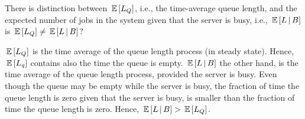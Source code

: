\begin{question}
  There is distinction between $\,\mathbb{E}\left[L_Q\right]$, i.e., the time-average queue
  length, and the expected number of jobs in the system given that the
  server is busy, i.e., $\,\mathbb{E}\left[L\,\middle|\, B\right]$ is $\,\mathbb{E}\left[L_Q\right] \neq \,\mathbb{E}\left[L\,\middle|\, B\right]$?
\begin{solution}
  $\,\mathbb{E}\left[L_Q\right]$ is the time average of the queue length process (in steady
  state). Hence, $\,\mathbb{E}\left[L_q\right]$ contains also the time the queue is
  empty. $\,\mathbb{E}\left[L\,\middle|\, B\right]$ the other hand, is the time average of the
  queue length process, provided the server is busy. Even though the
  queue may be empty while the server is busy, the fraction of time
  the queue length is zero given that the server is busy, is smaller
  than the fraction of time the queue length is zero.  Hence,
  $\,\mathbb{E}\left[L\,\middle|\, B\right] > \,\mathbb{E}\left[L_Q\right]$.
\end{solution}
\end{question}

